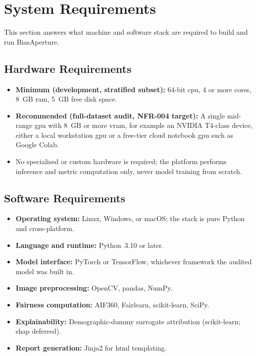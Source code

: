 \section{System Requirements}
This section answers what machine and software stack are required to build and run BiasAperture.

\subsection{Hardware Requirements}
\begin{itemize}
    \item \textbf{Minimum (development, stratified subset):} 64-bit \gls{cpu}, 4 or more cores, 8~GB \gls{ram}, 5~GB free disk space.
    \item \textbf{Recommended (full-dataset audit, NFR-004 target):} A single mid-range \gls{gpu} with 8~GB or more \gls{vram}, for example an NVIDIA T4-class device, either a local workstation \gls{gpu} or a free-tier cloud notebook \gls{gpu} such as Google Colab.
    \item No specialised or custom hardware is required; the platform performs inference and metric computation only, never model training from scratch.
\end{itemize}

\subsection{Software Requirements}
\begin{itemize}
    \item \textbf{Operating system:} Linux, Windows, or macOS; the stack is pure Python and cross-platform.
    \item \textbf{Language and runtime:} Python~3.10 or later.
    \item \textbf{Model interface:} PyTorch or TensorFlow, whichever framework the audited model was built in.
    \item \textbf{Image preprocessing:} OpenCV, pandas, NumPy.
    \item \textbf{Fairness computation:} AIF360, Fairlearn, scikit-learn, SciPy.
    \item \textbf{Explainability:} Demographic-dummy surrogate attribution (scikit-learn; \gls{shap} deferred).
    \item \textbf{Report generation:} Jinja2 for \gls{html} templating.
\end{itemize}